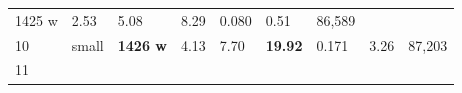 \documentclass[
  10pt, ]{article}
\begin{document}
\begin{longtable}[]{@{}lllllllll@{}}
\begin{minipage}[t]{0.08\columnwidth}
1425 w\strut
\end{minipage} & \begin{minipage}[t]{0.08\columnwidth}\raggedright
2.53\strut
\end{minipage} & \begin{minipage}[t]{0.08\columnwidth}\raggedright
5.08\strut
\end{minipage} & \begin{minipage}[t]{0.08\columnwidth}\raggedright
8.29\strut
\end{minipage} & \begin{minipage}[t]{0.08\columnwidth}\raggedright
0.080\strut
\end{minipage} & \begin{minipage}[t]{0.08\columnwidth}\raggedright
0.51\strut
\end{minipage} & \begin{minipage}[t]{0.08\columnwidth}\raggedright
86,589\strut
\end{minipage}\tabularnewline
\begin{minipage}[t]{0.08\columnwidth}\raggedright
10\strut
\end{minipage} & \begin{minipage}[t]{0.08\columnwidth}\raggedright
small\strut
\end{minipage} & \begin{minipage}[t]{0.08\columnwidth}\raggedright
\textbf{1426 w}\strut
\end{minipage} & \begin{minipage}[t]{0.08\columnwidth}\raggedright
4.13\strut
\end{minipage} & \begin{minipage}[t]{0.08\columnwidth}\raggedright
7.70\strut
\end{minipage} & \begin{minipage}[t]{0.08\columnwidth}\raggedright
\textbf{19.92}\strut
\end{minipage} & \begin{minipage}[t]{0.08\columnwidth}\raggedright
0.171\strut
\end{minipage} & \begin{minipage}[t]{0.08\columnwidth}\raggedright
3.26\strut
\end{minipage} & \begin{minipage}[t]{0.08\columnwidth}\raggedright
87,203\strut
\end{minipage}\tabularnewline
\begin{minipage}[t]{0.08\columnwidth}\raggedright
11\strut
\end{minipage} & \begin{minipage}[t]{0.08\columnwidth}\raggedright

\end{minipage}
\end{longtable}
\end{document}
